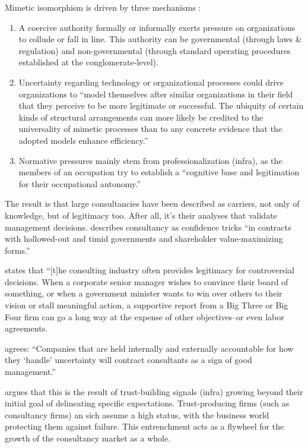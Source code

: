 \documentclass[12pt]{article}
\providecommand{\tightlist}{%
  \setlength{\itemsep}{0pt}\setlength{\parskip}{0pt}}
\begin{document}
Mimetic isomorphism is driven by three mechanisms \citep[
150-154]{dimaggio1983}:

\begin{enumerate}
\def\labelenumi{\arabic{enumi}.}
\tightlist
\item
  A coercive authority formally or informally exerts pressure on
  organizations to collude or fall in line. This authority can be
  governmental (through laws \& regulation) and non-governmental
  (through standard operating procedures established at the
  conglomerate-level).
\item
  Uncertainty regarding technology or organizational processes could
  drive organizations to ``model themselves after similar organizations
  in their field that they perceive to be more legitimate or successful.
  The ubiquity of certain kinds of structural arrangements can more
  likely be credited to the universality of mimetic processes than to
  any concrete evidence that the adopted models enhance efficiency.''
\item
  Normative pressures mainly stem from professionalization (infra), as
  the members of an occupation try to establish a ``cognitive base and
  legitimation for their occupational autonomy.''
\end{enumerate}

The result is that large consultancies have been described as carriers,
not only of knowledge, but of legitimacy too. After all, it's their
analyses that validate management decisions. \citet[16]{mazzucato2023}
describes consultancy as confidence tricks ``in contracts with
hollowed-out and timid governments and shareholder value-maximizing
forms.''

\citet[21]{mazzucato2023} states that ``{[}t{]}he consulting industry
often provides legitimacy for controversial decisions. When a corporate
senior manager wishes to convince their board of something, or when a
government minister wants to win over others to their vision or stall
meaningful action, a supportive report from a Big Three or Big Four firm
can go a long way at the expense of other objectives--or even labor
agreements.

\citet[69]{kieser2006} agrees: ``Companies that are held internally and
externally accountable for how they `handle' uncertainty will contract
consultants as a sign of good management.''

\citet[20-21]{zucker1985} argues that this is the result of
trust-building signals (infra) growing beyond their initial goal of
delineating specific expectations. Trust-producing firms (such as
consultancy firms) an sich assume a high status, with the business world
protecting them against failure. This entrenchment acts as a flywheel
for the growth of the consultancy market as a whole.
\end{document}
